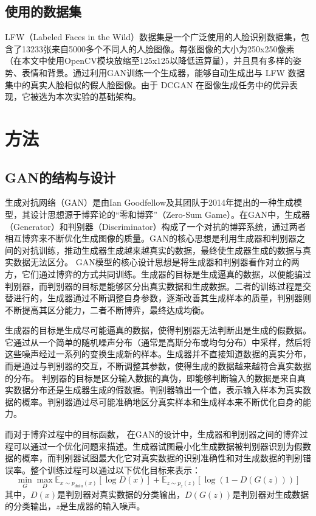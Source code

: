 \documentclass[UTF8]{ctexart}
\begin{document}
\subsection{使用的数据集}
LFW（Labeled Faces in the Wild）数据集是一个广泛使用的人脸识别数据集，包含了13233张来自5000多个不同人的人脸图像。每张图像的大小为250x250像素（在本文中使用OpenCV模块放缩至125x125以降低运算量），并且具有多样的姿势、表情和背景。通过利用GAN训练一个生成器，能够自动生成出与 LFW 数据集中的真实人脸相似的假人脸图像。由于 DCGAN 在图像生成任务中的优异表现，它被选为本次实验的基础架构。
\section{方法}
\subsection{GAN的结构与设计}
生成对抗网络（GAN）是由Ian Goodfellow及其团队于2014年提出的一种生成模型，其设计思想源于博弈论的“零和博弈”（Zero-Sum Game）。在GAN中，生成器（Generator）和判别器（Discriminator）构成了一个对抗的博弈系统，通过两者相互博弈来不断优化生成图像的质量。GAN的核心思想是利用生成器和判别器之间的对抗训练，推动生成器生成越来越真实的数据，最终使生成器生成的数据与真实数据无法区分。
GAN模型的核心设计思想是将生成器和判别器看作对立的两方，它们通过博弈的方式共同训练。生成器的目标是生成逼真的数据，以便能骗过判别器，而判别器的目标是能够区分出真实数据和生成数据。二者的训练过程是交替进行的，生成器通过不断调整自身参数，逐渐改善其生成样本的质量，判别器则不断提高其区分能力，二者不断博弈，最终达成均衡。\par
生成器的目标是生成尽可能逼真的数据，使得判别器无法判断出是生成的假数据。它通过从一个简单的随机噪声分布（通常是高斯分布或均匀分布）中采样，然后将这些噪声经过一系列的变换生成新的样本。生成器并不直接知道数据的真实分布，而是通过与判别器的交互，不断调整其参数，使得生成的数据越来越符合真实数据的分布。 判别器的目标是区分输入数据的真伪，即能够判断输入的数据是来自真实数据分布还是生成器生成的假数据。判别器输出一个值，表示输入样本为真实数据的概率。判别器通过尽可能准确地区分真实样本和生成样本来不断优化自身的能力。

而对于博弈过程中的目标函数， 在GAN的设计中，生成器和判别器之间的博弈过程可以通过一个优化问题来描述。生成器试图最小化生成数据被判别器识别为假数据的概率，而判别器试图最大化它对真实数据的识别准确性和对生成数据的判别错误率。整个训练过程可以通过以下优化目标来表示：
$$\min_G \max_D \mathbb{E}_{x \sim p_{data}(x)}[\log D(x)] + \mathbb{E}_{z \sim p_z(z)}[\log (1 - D(G(z)))]$$
其中，$D(x)$是判别器对真实数据的分类输出，$D(G(z))$是判别器对生成数据的分类输出，$z$是生成器的输入噪声。
\end{document}
